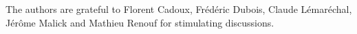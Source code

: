 \documentclass[graybox]{svmult}
\begin{document}
\abstract{\ourabstract}





\begin{acknowledgement}
The authors are grateful to Florent Cadoux, Fr\'ed\'eric Dubois, Claude L\'emar\'echal, J\'er\^ome Malick and Mathieu Renouf  for stimulating discussions.
\end{acknowledgement}
%




%



%
\end{document}
